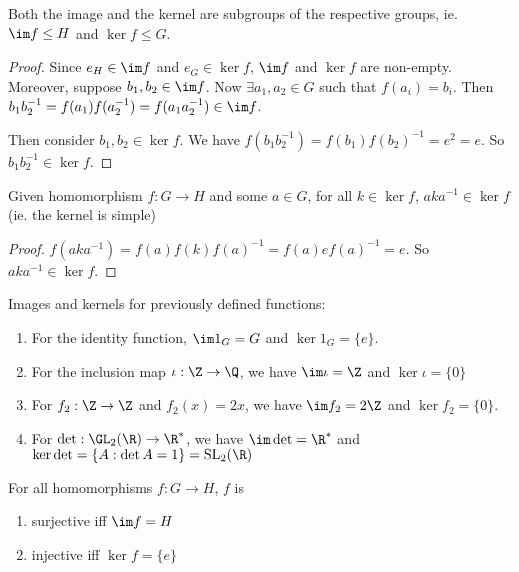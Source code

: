 \documentclass[a4paper]{article}
\begin{document}
  \begin{prop}
    Both the image and the kernel are subgroups of the respective groups, ie. $\im f\leq H$ and $\ker f \leq G$.
  \end{prop}

  \begin{proof}
    Since $e_H\in \im f$ and $e_G\in \ker f$, $\im f$ and $\ker f$ are non-empty. Moreover, suppose $b_1, b_2\in \im f$. Now $\exists a_1, a_2 \in G$ such that $f(a_i) = b_i$. Then $b_1b_2^{-1} = f(a_1)f(a_2^{-1}) = f(a_1a_2^{-1})\in \im f$. 

    Then consider $b_1,b_2\in \ker f$. We have $f(b_1b_2^{-1}) = f(b_1)f(b_2)^{-1} = e^2 = e$. So $b_1b_2^{-1}\in \ker f$.
  \end{proof}

  \begin{prop}
    Given homomorphism $f:G\rightarrow H$ and some $a\in G$, for all $k\in \ker f$, $aka^{-1}\in\ker f$ (ie. the kernel is simple)
  \end{prop}

  \begin{proof}
    $f(aka^{-1}) = f(a)f(k)f(a)^{-1} = f(a)ef(a)^{-1} = e$. So $aka^{-1}\in \ker f$.
  \end{proof}

  \begin{eg}
    Images and kernels for previously defined functions:
    \begin{enumerate}
      \item For the identity function, $\im 1_G = G$ and $\ker 1_G = \{e\}$.
      \item For the inclusion map $\iota: \Z\rightarrow\Q$, we have $\im \iota = \Z$ and $\ker \iota = \{0\}$
      \item For $f_2:\Z\rightarrow\Z$ and $f_2(x) = 2x$, we have $\im f_2 = 2\Z$ and $\ker f_2 = \{0\}$.
      \item For $\det: \GL_2(\R) \rightarrow \R^*$, we have $\im \det = \R^*$ and $\ker \det = \{A:\det A = 1\} = \mathrm{SL}_2(\R)$
    \end{enumerate}
  \end{eg}
  \begin{prop}
    For all homomorphisms $f:G\rightarrow H$, $f$ is
    \begin{enumerate}
      \item surjective iff $\im f = H$
      \item injective iff $\ker f = \{e\}$
    \end{enumerate}
  \end{prop}
\end{document}
